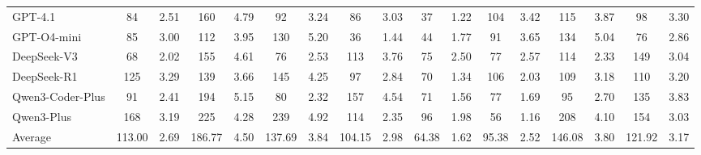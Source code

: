 \documentclass[acmsmall]{acmart}
\begin{document}
\begin{table}[htbp!]
\begin{tabular}{l|cc|cc|cc|cc|cc|cc|cc|cc}
GPT-4.1 & 84 & 2.51 & 160 & 4.79 & 92 & 3.24 & 86 & 3.03 & 37 & 1.22 & 104 & 3.42 & 115 & 3.87 & 98 & 3.30 \\
GPT-O4-mini & 85 & 3.00 & 112 & 3.95 & 130 & 5.20 & 36 & 1.44 & 44 & 1.77 & 91 & 3.65 & 134 & 5.04 & 76 & 2.86 \\
DeepSeek-V3 & 68 & 2.02 & 155 & 4.61 & 76 & 2.53 & 113 & 3.76 & 75 & 2.50 & 77 & 2.57 & 114 & 2.33 & 149 & 3.04 \\
DeepSeek-R1 & 125 & 3.29 & 139 & 3.66 & 145 & 4.25 & 97 & 2.84 & 70 & 1.34 & 106 & 2.03 & 109 & 3.18 & 110 & 3.20 \\
Qwen3-Coder-Plus & 91 & 2.41 & 194 & 5.15 & 80 & 2.32 & 157 & 4.54 & 71 & 1.56 & 77 & 1.69 & 95 & 2.70 & 135 & 3.83 \\
Qwen3-Plus & 168 & 3.19 & 225 & 4.28 & 239 & 4.92 & 114 & 2.35 & 96 & 1.98 & 56 & 1.16 & 208 & 4.10 & 154 & 3.03 \\
\midrule
Average & 113.00 & 2.69 & 186.77 & 4.50 & 137.69 & 3.84 & 104.15 & 2.98 & 64.38 & 1.62 & 95.38 & 2.52 & 146.08 & 3.80 & 121.92 & 3.17 \\
\bottomrule
\end{tabular}
\vspace{-1.0em}
\end{table}
\end{document}
